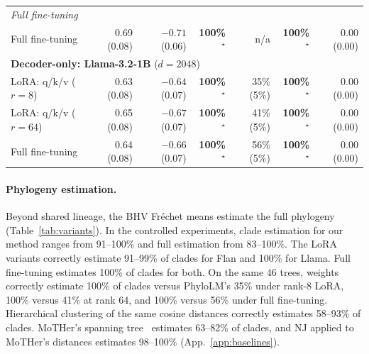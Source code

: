 \documentclass{article}
\theoremstyle{definition}
\theoremstyle{plain}
\newif\ifrevision
\newcommand{\rev}[1]{\ifrevision{\color{blue}#1}\else#1\fi}
\newcommand{\revtag}[1]{\ifrevision\textsuperscript{\color{blue}\sffamily\scriptsize[#1]}\fi}
\begin{document}
\begin{table}[h]
\begin{center}
{\begin{tabular}{lrrrrrr}
\multicolumn{7}{l}{\quad\textit{Full fine-tuning}} \\
\quad Full fine-tuning                  & 0.69 (0.08) & $-0.71$ (0.06) & \textbf{100\%}$^\star$ & n/a & \textbf{100\%}$^\star$ & 0.00 (0.00) \\
\midrule
\multicolumn{7}{l}{\textbf{Decoder-only: Llama-3.2-1B} ($d=2048$)} \\
\quad LoRA: q/k/v ($r{=}8$)              & 0.63 (0.08) & $-0.64$ (0.07) & \textbf{100\%}$^\star$ & 35\% (5\%) & \textbf{100\%}$^\star$ & 0.00 (0.00) \\
\quad LoRA: q/k/v ($r{=}64$)             & 0.65 (0.08) & $-0.67$ (0.07) & \textbf{100\%}$^\star$ & 41\% (5\%) & \textbf{100\%}$^\star$ & 0.00 (0.00) \\
\quad Full fine-tuning                   & 0.64 (0.08) & $-0.66$ (0.07) & \textbf{100\%}$^\star$ & 56\% (5\%) & \textbf{100\%}$^\star$ & 0.00 (0.00) \\
\bottomrule
\end{tabular}
}
\end{center}
\end{table}



\paragraph{Phylogeny estimation.}
\label{sec:results:weighttree}
Beyond shared lineage, the BHV Fr\'echet means estimate the full phylogeny (Table~\ref{tab:variants}). In the controlled experiments, clade estimation for our method ranges from \rev{91}--100\% and full estimation from \rev{83}--100\%. The LoRA variants correctly estimate \rev{91}--99\%\revtag{Corr.} of clades for Flan and 100\% for Llama. Full fine-tuning estimates 100\% of clades for both. On the same 46 trees, weights correctly estimate 100\% of clades versus PhyloLM's 35\% under rank-8 LoRA, 100\% versus 41\% at rank 64, and 100\% versus 56\% under full fine-tuning. \rev{Hierarchical clustering of the same cosine distances correctly estimates 58--93\% of clades. MoTHer's spanning tree~\citep{horwitz2025mother} estimates 63--82\% of clades, and NJ applied to MoTHer's distances estimates 98--100\% (App.~\ref{app:baselines}).}\revtag{tWEn W3; S8sV Q1}
\end{document}
